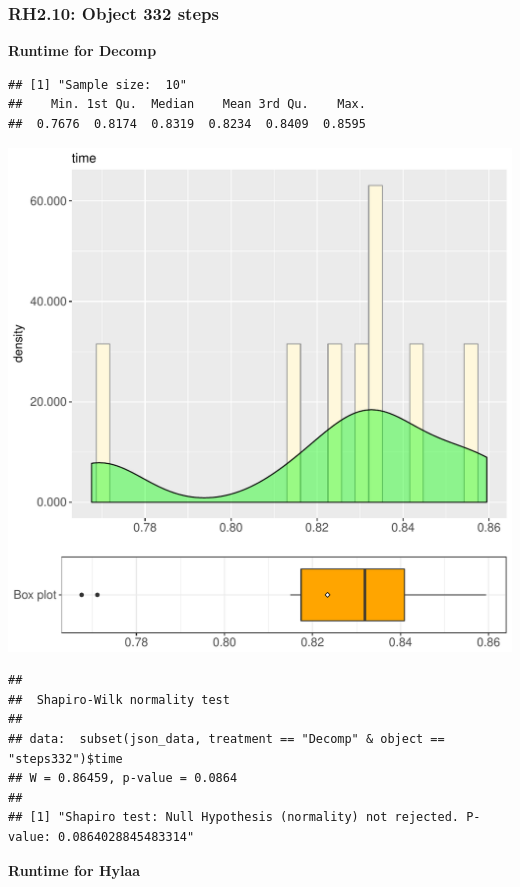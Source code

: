 \documentclass{article}\usepackage[]{graphicx}\usepackage[]{color}
\makeatletter
\def\maxwidth{ %
  \ifdim\Gin@nat@width>\linewidth
    \linewidth
  \else
    \Gin@nat@width
  \fi
}
\newenvironment{kframe}{%
 \def\at@end@of@kframe{}%
 \ifinner\ifhmode%
  \def\at@end@of@kframe{\end{minipage}}%
  \begin{minipage}{\columnwidth}%
 \fi\fi%
 \def\FrameCommand##1{\hskip\@totalleftmargin \hskip-\fboxsep
 \colorbox{shadecolor}{##1}\hskip-\fboxsep
     \hskip-\linewidth \hskip-\@totalleftmargin \hskip\columnwidth}%
 \MakeFramed {\advance\hsize-\width
   \@totalleftmargin\z@ \linewidth\hsize
   \@setminipage}}%
 {\par\unskip\endMakeFramed%
 \at@end@of@kframe}
\newenvironment{knitrout}{}{} %
\makeatother
\begin{document}
\subsubsection{RH2.10: Object 332 steps}

 \textbf{Runtime for Decomp}
\begin{knitrout}
\color{fgcolor}\begin{kframe}
\begin{verbatim}
## [1] "Sample size:  10"
##    Min. 1st Qu.  Median    Mean 3rd Qu.    Max. 
##  0.7676  0.8174  0.8319  0.8234  0.8409  0.8595
\end{verbatim}
\end{kframe}
\includegraphics[width=\maxwidth]{figure/RH2_Decomp_steps332-1} 
\begin{kframe}\begin{verbatim}
## 
## 	Shapiro-Wilk normality test
## 
## data:  subset(json_data, treatment == "Decomp" & object == "steps332")$time
## W = 0.86459, p-value = 0.0864
## 
## [1] "Shapiro test: Null Hypothesis (normality) not rejected. P-value: 0.0864028845483314"
\end{verbatim}
\end{kframe}
\end{knitrout}
 \textbf{Runtime for Hylaa}
\end{document}
